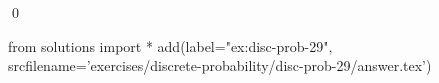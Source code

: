 
\begin{ex} 
  \label{ex:disc-prob-29}
  
  \qed
\end{ex} 
\begin{python0}
from solutions import *
add(label="ex:disc-prob-29",
    srcfilename='exercises/discrete-probability/disc-prob-29/answer.tex') 
\end{python0}
